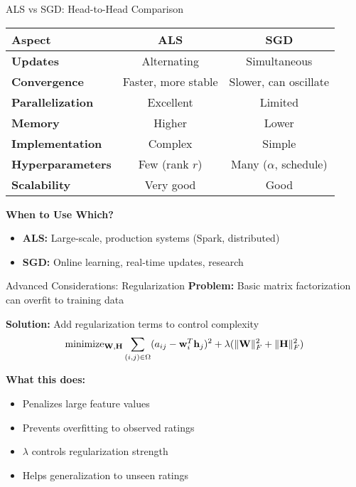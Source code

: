 \documentclass{beamer}
\begin{document}
\begin{frame}{ALS vs SGD: Head-to-Head Comparison}
\begin{center}
\renewcommand{\arraystretch}{1.4}
\begin{tabular}{l|cc}
\toprule
\textbf{Aspect} & \textbf{ALS} & \textbf{SGD} \\
\midrule
\textbf{Updates} & Alternating & Simultaneous \\
\textbf{Convergence} & Faster, more stable & Slower, can oscillate \\
\textbf{Parallelization} & Excellent & Limited \\
\textbf{Memory} & Higher & Lower \\
\textbf{Implementation} & Complex & Simple \\
\textbf{Hyperparameters} & Few (rank $r$) & Many ($\alpha$, schedule) \\
\textbf{Scalability} & Very good & Good \\
\bottomrule
\end{tabular}
\end{center}

\pause
\textbf{When to Use Which?}
\begin{itemize}[<+->]
    \item \textbf{ALS:} Large-scale, production systems (Spark, distributed)
    \item \textbf{SGD:} Online learning, real-time updates, research
\end{itemize}
\end{frame}

\begin{frame}{Advanced Considerations: Regularization}
\textbf{Problem:} Basic matrix factorization can overfit to training data

\pause
\textbf{Solution:} Add regularization terms to control complexity
\begin{equation*}
\operatorname{minimize}_{\mathbf{W},\mathbf{H}} \sum_{(i,j) \in \Omega} (a_{ij} - \mathbf{w}_i^T \mathbf{h}_j)^2 + \lambda(\|\mathbf{W}\|_F^2 + \|\mathbf{H}\|_F^2)
\end{equation*}

\pause
\textbf{What this does:}
\begin{itemize}[<+->]
    \item Penalizes large feature values
    \item Prevents overfitting to observed ratings
    \item $\lambda$ controls regularization strength
    \item Helps generalization to unseen ratings
\end{itemize}
\end{frame}
\end{document}
